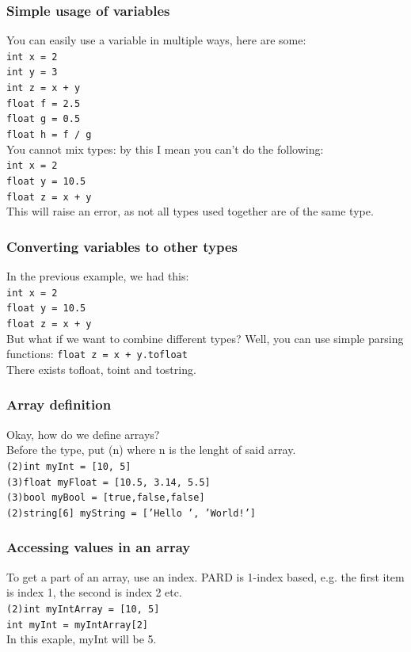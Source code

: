 \documentclass[11pt,a4paper]{article}
\begin{document}
\subsubsection{Simple usage of variables}
You can easily use a variable in multiple ways, here are some: \\
\texttt{int x = 2} \\
\texttt{int y = 3} \\
\texttt{int z = x + y} \\
\texttt{float f = 2.5} \\
\texttt{float g = 0.5} \\
\texttt{float h = f / g} \\
You cannot mix types: by this I mean you can't do the following: \\
\texttt{int x = 2} \\
\texttt{float y = 10.5} \\
\texttt{float z = x + y} \\
This will raise an error, as not all types used together are of the same type.
\subsubsection{Converting variables to other types}
In the previous example, we had this: \\
\texttt{int x = 2} \\
\texttt{float y = 10.5} \\
\texttt{float z = x + y} \\
But what if we want to combine different types? Well, you can use simple parsing functions:
\texttt{float z = x + y.tofloat} \\
There exists tofloat, toint and tostring.
\subsubsection{Array definition}
Okay, how do we define arrays? \\
Before the type, put (n) where n is the lenght of said array. \\
\texttt{(2)int myInt = [10, 5]} \\
\texttt{(3)float myFloat = [10.5, 3.14, 5.5]} \\
\texttt{(3)bool myBool = [true,false,false]} \\ 
\texttt{(2)string[6] myString = ['Hello ', 'World!']}
\subsubsection{Accessing values in an array}
To get a part of an array, use an index. PARD is 1-index based, e.g. the first item is index 1, the second is index 2 etc. \\
\texttt{(2)int myIntArray = [10, 5] \\ int myInt = myIntArray[2]} \\
In this exaple, myInt will be 5.
\end{document}
